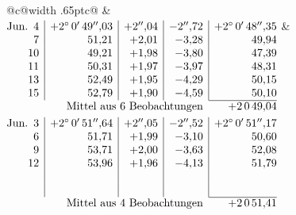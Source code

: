 \noindent\begin{tabular}{@{}c@{\hspace{.4em}\vrule width .65pt\hspace{.4em}}c@{}}
 &
 \\[.18ex]
\(\begin{array}[t]{@{}r|r|r|r|r@{}}
\text{Jun.}\enspace 4 & +2^\circ\,0'\,49''{,}03 & +2''{,}04 & -2''{,}72 & +2^\circ\,0'\,48''{,}35\\
7 & 51{,}21 & +2{,}01 & -3{,}28 & 49{,}94\\
10 & 49{,}21 & +1{,}98 & -3{,}80 & 47{,}39\\
11 & 50{,}31 & +1{,}97 & -3{,}97 & 48{,}31\\
13 & 52{,}49 & +1{,}95 & -4{,}29 & 50{,}15\\
15 & 52{,}79 & +1{,}90 & -4{,}59 & 50{,}10\\
\cline{5-5}
\multicolumn{4}{r}{\text{Mittel aus 6 Beobachtungen}} & +2\,0\,49{,}04
\end{array}\)
&
\(\begin{array}[t]{@{}r|r|r|r|r@{}}
\text{Jun.}\enspace 3 & +2^\circ\,0'\,51''{,}64 & +2''{,}05 & -2''{,}52 & +2^\circ\,0'\,51''{,}17\\
6 & 51{,}71 & +1{,}99 & -3{,}10 & 50{,}60\\
9 & 53{,}71 & +2{,}00 & -3{,}63 & 52{,}08\\
12 & 53{,}96 & +1{,}96 & -4{,}13 & 51{,}79\\
 & & & & \\
 & & & & \\
\cline{5-5}
\multicolumn{4}{r}{\text{Mittel aus 4 Beobachtungen}} & +2\,0\,51{,}41
\end{array}\)
\end{tabular}\par\medskip

\par\clearpage
\noindent\makebox[12mm][l]{}\par\medskip

